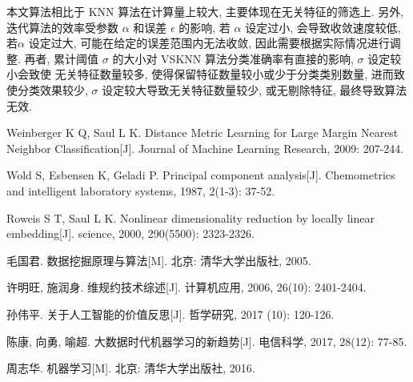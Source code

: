 \documentclass[11pt]{article}
\numberwithin{equation}{section}
\begin{document}
本文算法相比于 KNN 算法在计算量上较大, 主要体现在无关特征的筛选上. 另外, 迭代算法的效率受参数 $\alpha$ 和误差 $\epsilon$
的影响, 若 $\alpha$ 设定过小, 会导致收敛速度较低, 若$\alpha$ 设定过大, 可能在给定的误差范围内无法收敛, 因此需要根据实际情况进行调整. 再者, 累计阈值 $\sigma$ 的大小对 VSKNN 算法分类准确率有直接的影响, $\sigma$ 设定较小会致使
无关特征数量较多, 使得保留特征数量较小或少于分类类别数量, 进而致使分类效果较少, $\sigma$ 设定较大导致无关特征数量较少, 或无剔除特征, 最终导致算法无效. 





\begin{thebibliography}{99}
\addtolength{\itemsep}{-0.7em}

 Weinberger K Q, Saul L K. Distance Metric Learning for Large Margin Nearest Neighbor Classification[J]. Journal of Machine Learning Research, 2009: 207-244.

  Wold S, Esbensen K, Geladi P. Principal component analysis[J]. Chemometrics and intelligent laboratory systems, 1987, 2(1-3): 37-52.

 Roweis S T, Saul L K. Nonlinear dimensionality reduction by locally linear embedding[J]. science, 2000, 290(5500): 2323-2326.

 毛国君. 数据挖掘原理与算法[M]. 北京: 清华大学出版社, 2005.

 许明旺, 施润身. 维规约技术综述[J]. 计算机应用, 2006, 26(10): 2401-2404.

 孙伟平. 关于人工智能的价值反思[J]. 哲学研究, 2017 (10): 120-126.

 陈康, 向勇, 喻超. 大数据时代机器学习的新趋势[J]. 电信科学, 2017, 28(12): 77-85.

 周志华. 机器学习[M]. 北京: 清华大学出版社, 2016.

\end{thebibliography}
\end{document}
